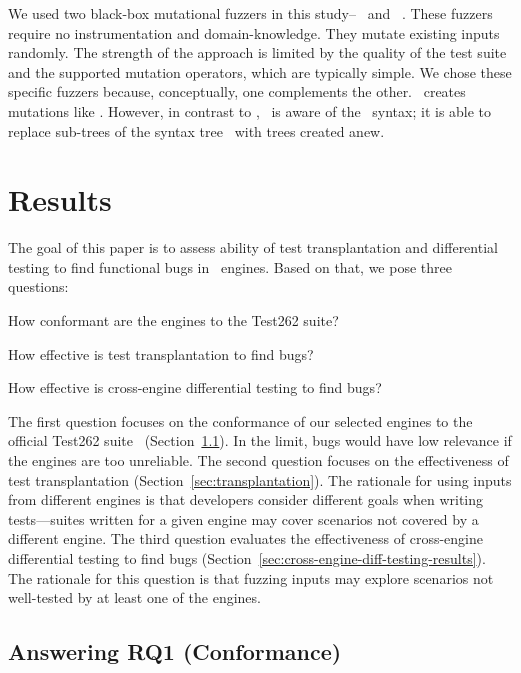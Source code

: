 \documentclass[smallextended]{svjour3}
\begin{document}
We used two black-box mutational fuzzers in this
study--\radamsa~\cite{radamsa} and \quickfuzz~\cite{quickfuzz}. These
fuzzers require no instrumentation and domain-knowledge. They mutate
existing inputs randomly. The strength of the approach is
limited by the quality of the test suite and the supported mutation
operators, which are typically simple. We chose these specific fuzzers
because, conceptually, one complements the other. \quickfuzz\ creates
mutations like \radamsa. However, in contrast to \radamsa, \quickfuzz\ is aware
of the \js\ syntax; it is able to replace sub-trees of the syntax
tree~\cite{grieco2016quickfuzz} with trees created anew.

\section{Results}
\label{sec:results}

The goal of this paper is to assess ability of
test transplantation and differential testing
to find functional bugs
in \javascript\ engines. Based on that, we pose three questions:
\begin{description}[leftmargin=.5in]
\item[RQ1.] How conformant are the engines to the Test262 suite?
\item[RQ2.] How effective is test transplantation to find bugs?
\item[RQ3.] How effective is cross-engine differential testing to find bugs?
\end{description}

The first question focuses on the conformance of our selected engines
to the official Test262 suite~\cite{ecma262-conformance-suite}
(Section~\ref{sec:stability}). In the limit, bugs would have low
relevance if the engines are too unreliable. The second question
focuses on the effectiveness of test transplantation
(Section~\ref{sec:transplantation}). The rationale for using inputs
from different engines is that developers consider different goals
when writing tests---suites written for a given engine may cover
scenarios not covered by a different engine. The third question
evaluates the effectiveness of cross-engine differential testing to
find bugs (Section~\ref{sec:cross-engine-diff-testing-results}). The
rationale for this question is that fuzzing inputs may explore
scenarios not well-tested by at least one of the engines.

\subsection{Answering RQ1 (Conformance)}
\label{sec:stability}
\end{document}
